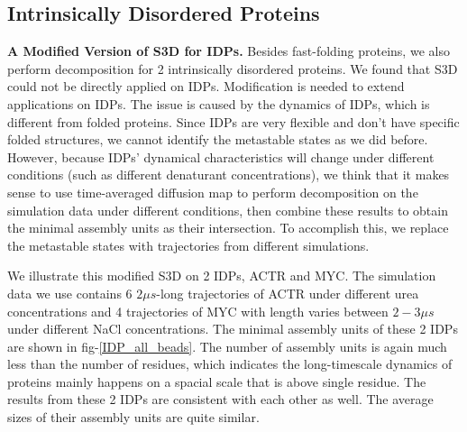\documentclass[journal=jacsat,manuscript=article]{achemso}
\begin{document}
\subsection{Intrinsically Disordered Proteins}

{\bf A Modified Version of S3D for IDPs.} Besides fast-folding proteins, we also perform decomposition for 2 intrinsically disordered proteins. We found that S3D could not be directly applied on IDPs. Modification is needed to extend applications on IDPs. The issue is caused by the dynamics of IDPs, which is different from folded proteins. Since IDPs are very flexible and don't have specific folded structures\cite{IDP,IDP_TOMPA}, we cannot identify the metastable states as we did before\cite{IDP_dynamics}. However, because IDPs' dynamical characteristics will change under different conditions (such as different denaturant concentrations), we think that it makes sense to use time-averaged diffusion map\cite{Lrenzo_S3D} to perform decomposition on the simulation data under different conditions, then combine these results to obtain the minimal assembly units as their intersection. To accomplish this, we replace the metastable states with trajectories from different simulations.

We illustrate this modified S3D on 2 IDPs, ACTR and MYC. The simulation data we use contains 6 $2\mu s$-long trajectories of ACTR under different urea concentrations\cite{ACTR} and 4 trajectories of MYC with length varies between $2-3\mu s$ under different NaCl concentrations\cite{MYC}. The minimal assembly units of these 2 IDPs are shown in fig-\ref{IDP_all_beads}. The number of assembly units is again much less than the number of residues, which indicates the long-timescale dynamics of proteins mainly happens on a spacial scale that is above single residue. The results from these 2 IDPs are consistent with each other as well. The average sizes of their assembly units are quite similar.
\end{document}
